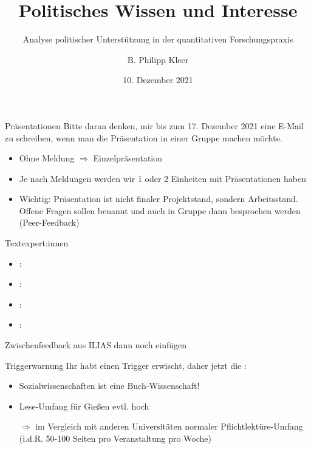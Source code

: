 \documentclass[11pt]{beamer}
\title{Politisches Wissen und Interesse}
\subtitle{Analyse politischer Unterstützung in der quantitativen Forschungspraxis}
\date{10. Dezember 2021}
\author{B. Philipp Kleer}
\institute{Institut für Politikwissenschaft | Justus-Liebig-Universität Gießen}
\begin{document}
\begin{frame}
	\maketitle
\end{frame}

\begin{frame}[t]{Präsentationen}
Bitte daran denken, mir bis zum 17. Dezember 2021 eine E-Mail zu schreiben, wenn man die Präsentation in einer Gruppe machen möchte. 

  \begin{itemize}
    \item Ohne Meldung $\Rightarrow$ Einzelpräsentation
    \item Je nach Meldungen werden wir 1 oder 2 Einheiten mit Präsentationen haben
    \item Wichtig: Präsentation ist nicht finaler Projektstand, sondern Arbeitsstand. Offene Fragen sollen benannt und auch in Gruppe dann besprochen werden (Peer-Feedback)
  \end{itemize}
\end{frame}

\begin{frame}{Textexpert:innen}
	\begin{itemize}
		\item \cite{vanDeth2004}:
		\item \cite{Westle2020}:
		\item \cite{Reichert2019}:
		\item \cite{Russo2017}:
	\end{itemize}
\end{frame}

\begin{frame}{Zwischenfeedback}
aus ILIAS dann noch einfügen

\end{frame}

\begin{frame}[t]{Triggerwarnung}
Ihr habt einen Trigger erwischt, daher jetzt die :

  \begin{itemize}
    \item Sozialwissenschaften ist eine Buch-Wissenschaft!
    \item Lese-Umfang für Gießen evtl. hoch
    \item[$\Rightarrow$] im Vergleich mit anderen Universitäten normaler Pflichtlektüre-Umfang (i.d.R. 50-100 Seiten pro Veranstaltung pro Woche)
  \end{itemize}
\end{frame}
\end{document}

